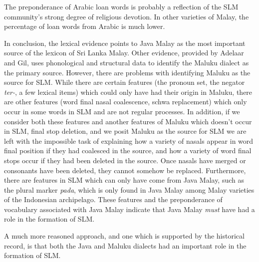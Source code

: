 The preponderance of Arabic loan words is probably a reflection of the SLM community's strong degree of religious devotion. In other varieties of Malay, the percentage of loan words from Arabic is much lower.

In conclusion, the lexical evidence points to Java Malay as the most important source of the lexicon of Sri Lanka Malay. Other evidence, provided by Adelaar and Gil, uses phonological and structural data to identify the Maluku dialect as the primary source. However, there are problems with identifying Maluku as the source for SLM. While there are certain features (the pronoun set, the negator \textit{ter-}, a few lexical items) which could only have had their origin in Maluku, there are other features (word final nasal coalescence, schwa replacement) which only occur in some words in SLM and are not regular processes. In addition, if we consider both these features and another features of Maluku which doesn't occur in SLM, final stop deletion, and we posit Maluku as the source for SLM we are left with the impossible task of explaining how a variety of nasals appear in word final position if they had coalesced in the source, and how a variety of word final stops occur if they had been deleted in the source. Once nasals have merged or consonants have been deleted, they cannot somehow be replaced. Furthermore, there are features in SLM which can only have come from Java Malay, such as the plural marker \textit{pada}, which is only found in Java Malay among Malay varieties of the Indonesian archipelago. These features and the preponderance of vocabulary associated with Java Malay indicate that Java Malay \textit{must} have had a role in the formation of SLM. 

A much more reasoned approach, and one which is supported by the historical record, is that both the Java and Maluku dialects had an important role in the formation of SLM. 